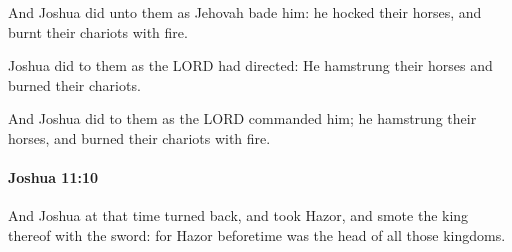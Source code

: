 			\begin{versebox}
					\item[BHS] 
					\item[ASV] And Joshua did unto them as Jehovah bade him: he hocked their horses, and burnt their chariots with fire.
					\item[NIV] Joshua did to them as the LORD had directed: He hamstrung their horses and burned their chariots.
					\item[NRSV] And Joshua did to them as the LORD commanded him; he hamstrung their horses, and burned their chariots with fire.
			\end{versebox}

		\paragraph{Joshua 11:10} %
			\label{JOSHUA-11-10}

			And Joshua at that time turned back, and took Hazor, and smote the king thereof with the sword: for Hazor beforetime was the head of all those kingdoms.

